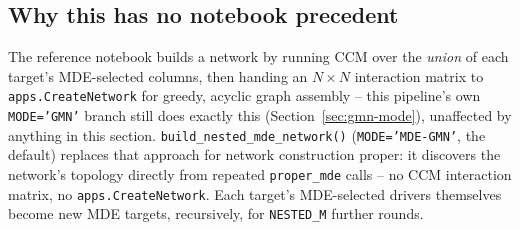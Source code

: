 \documentclass[11pt]{article}
\begin{document}
\subsection{Why this has no notebook precedent}
The reference notebook builds a network by running CCM over the \emph{union} of each target's MDE-selected columns, then handing an $N \times N$ interaction matrix to \texttt{apps.CreateNetwork} for greedy, acyclic graph assembly -- this pipeline's own \texttt{MODE='GMN'} branch still does exactly this (Section~\ref{sec:gmn-mode}), unaffected by anything in this section. \texttt{build\_nested\_mde\_network()} (\texttt{MODE='MDE-GMN'}, the default) replaces that approach for network construction proper: it discovers the network's topology directly from repeated \texttt{proper\_mde} calls -- no CCM interaction matrix, no \texttt{apps.CreateNetwork}. Each target's MDE-selected drivers themselves become new MDE targets, recursively, for \texttt{NESTED\_M} further rounds.
\end{document}
